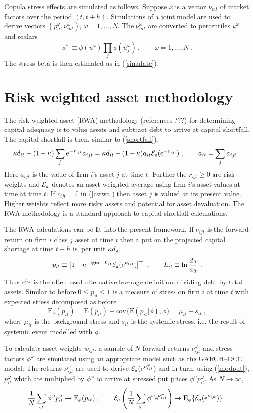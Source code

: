 \documentclass[authoryear]{elsarticle}
\newcommand{\logit}{\mathrm{lgt}}
\newcommand{\E}{\mathrm{E}}
\newcommand{\e}{\mathrm{e}}
\renewcommand{\o}{\omega}
\newcommand{\cov}{\mathrm{cov}}
\newcommand{\Ex}{{\cal E}}
\newcommand{\Es}{\E_\phi}
\newcommand{\eref}[1]{(\ref{#1})}
\newcommand{\cq}{\ , \qquad}
\newcommand{\be}[1]{\begin{equation}\label{#1}}
\newcommand{\ee}{\end{equation}}
\begin{document}
Copula stress effects are simulated as follows.   Suppose $x$ is a vector $\nu_{mt}$ of  market factors  over the period $(t,t+h)$.   Simulations of a joint model are  used to  derive  vectors $(p_{it}^\o,\nu_{mt}^\o)$, $ \o=1,\ldots, N$.  The $\nu_{mt}^\o$ are  converted to percentiles $u^\o$ and scalars 
$$
\phi^\o\equiv\phi(u^\o)\prod_j\phi(u_j^\o)\cq \o=1,\ldots, N\ .
$$
The stress beta is then estimated as in \eref{simulate}.

\section{Risk weighted asset methodology}

The risk weighted asset (RWA) methodology (references ???) for determining capital adequacy is to value  assets  and subtract debt to arrive at capital shortfall.   The capital shortfall is then, similar to \eref{shortfall},
\be{csrwa}
\kappa d_{it} - (1-\kappa)\sum_j \e^{-r_{ijt}}a_{ijt}  = \kappa d_{it} - (1-\kappa)a_{it}\Ex_a(\e^{-r_{ijt}})\cq a_{it}=\sum_j a_{ijt}\ .
\ee
Here $a_{ijt}$ is the value of firm $i$'s asset  $j$ at time $t$.   Further the $r_{ijt}\ge 0$ are risk weights and $\Ex_a$ denotes an asset weighted average using  firm $i$'s asset values at time at time $t$.   If  $r_{ijt}=0$ in  \eref{csrwa} then  asset $j$ is valued at its present value. Higher weights reflect more risky assets and  potential  for asset devaluation.   The RWA methodology is a standard  approach to capital shortfall calculations.

The RWA calculations can be fit into the present framework.   If $\nu_{ijt}$ is the forward return on firm $i$ class $j$ asset at time $t$ then     a put on the  projected capital shortage at time $t+h$ is, per unit $\kappa d_{it}$, 
\be{modput}
p_{it}\equiv \left|1 - \e^{-\logit\kappa-L_{it}}\Ex_a(\e^{\nu_{ijt}})\right|^+ \cq L_{it}\equiv \ln\frac{d_{it}}{a_{it}} \ .
\ee
Thus $\e^{L_{it}}$ is the often used alternative leverage definition: dividing debt by total assets.   Similar to before $0\le p_{it}\le 1$ is a measure of  stress on firm $i$ at time $t$ with expected stress decomposed as before
$$
\Es(p_{it}) = \E(p_{it}) + \cov\{\E(p_{it}|\phi),\phi\} = \mu_{it} + s_{it}\ ,
$$
where $\mu_{it}$ is the background stress and $s_{it}$ is the systemic stress, i.e. the result of systemic event modelled with $\phi$.  

To calculate asset weights $w_{ijt}$, a sample of $N$ forward returns $\nu_{ijt}^\o$ and stress factors $\phi^\o$ are  simulated using an appropriate model such as the GARCH--DCC model.   The returns $\nu_{ijt}^\o$ are used to derive $\Ex_a(\e^{\nu_{ijt}^\o})$ and in turn, using \eref{modput},   $p_{it}^\o$ which are multiplied by $\phi^\o$ to arrive at stressed put prices  $\phi^\o p_{it}^\o$.   As $N\rightarrow\infty$,
\be{rwa}
\frac{1}{N}\sum_\o \phi^\o p_{it}^\o\rightarrow \Es(p_{it})\cq \Ex_a\left( \frac{1}{N}\sum_\o\phi^\o\e^{\nu_{ijt}^\o}\right)\rightarrow \Es\{\Ex_a(\e^{\nu_{ijt}})\}\ .
\ee
\end{document}
